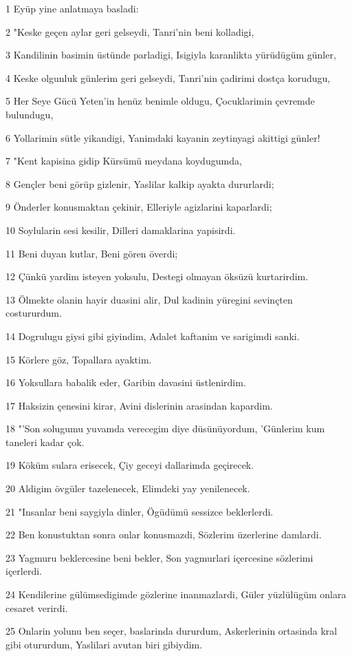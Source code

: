 \par 1 Eyüp yine anlatmaya basladi:
\par 2 "Keske geçen aylar geri gelseydi, Tanri'nin beni kolladigi,
\par 3 Kandilinin basimin üstünde parladigi, Isigiyla karanlikta yürüdügüm günler,
\par 4 Keske olgunluk günlerim geri gelseydi, Tanri'nin çadirimi dostça korudugu,
\par 5 Her Seye Gücü Yeten'in henüz benimle oldugu, Çocuklarimin çevremde bulundugu,
\par 6 Yollarimin sütle yikandigi, Yanimdaki kayanin zeytinyagi akittigi günler!
\par 7 "Kent kapisina gidip Kürsümü meydana koydugumda,
\par 8 Gençler beni görüp gizlenir, Yaslilar kalkip ayakta dururlardi;
\par 9 Önderler konusmaktan çekinir, Elleriyle agizlarini kaparlardi;
\par 10 Soylularin sesi kesilir, Dilleri damaklarina yapisirdi.
\par 11 Beni duyan kutlar, Beni gören överdi;
\par 12 Çünkü yardim isteyen yoksulu, Destegi olmayan öksüzü kurtarirdim.
\par 13 Ölmekte olanin hayir duasini alir, Dul kadinin yüregini sevinçten costururdum.
\par 14 Dogrulugu giysi gibi giyindim, Adalet kaftanim ve sarigimdi sanki.
\par 15 Körlere göz, Topallara ayaktim.
\par 16 Yoksullara babalik eder, Garibin davasini üstlenirdim.
\par 17 Haksizin çenesini kirar, Avini dislerinin arasindan kapardim.
\par 18 "'Son solugumu yuvamda verecegim diye düsünüyordum, 'Günlerim kum taneleri kadar çok.
\par 19 Köküm sulara erisecek, Çiy geceyi dallarimda geçirecek.
\par 20 Aldigim övgüler tazelenecek, Elimdeki yay yenilenecek.
\par 21 "Insanlar beni saygiyla dinler, Ögüdümü sessizce beklerlerdi.
\par 22 Ben konustuktan sonra onlar konusmazdi, Sözlerim üzerlerine damlardi.
\par 23 Yagmuru beklercesine beni bekler, Son yagmurlari içercesine sözlerimi içerlerdi.
\par 24 Kendilerine gülümsedigimde gözlerine inanmazlardi, Güler yüzlülügüm onlara cesaret verirdi.
\par 25 Onlarin yolunu ben seçer, baslarinda dururdum, Askerlerinin ortasinda kral gibi otururdum, Yaslilari avutan biri gibiydim.

